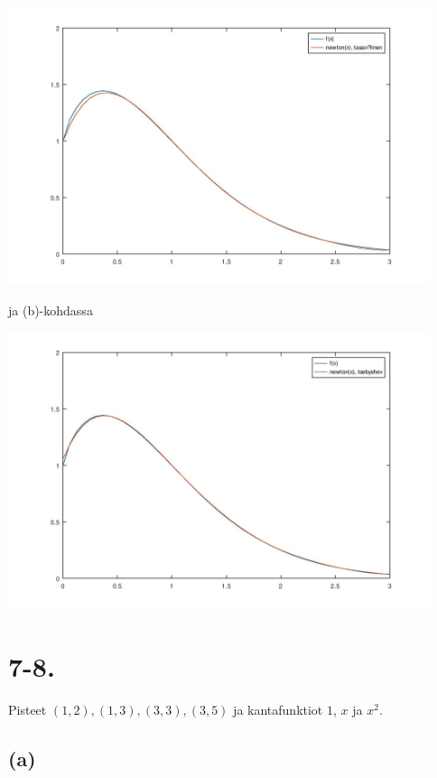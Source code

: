 \documentclass{article}
\begin{document}
\includegraphics[width=350pt]{w4_5a.jpg}

ja (b)-kohdassa

\includegraphics[width=350pt]{w4_5b.jpg}


\section*{7-8.}

Pisteet $(1,2),(1,3),(3,3),(3,5)$
ja kantafunktiot $1$, $x$ ja $x^2$.

\subsection*{(a)}
\end{document}

